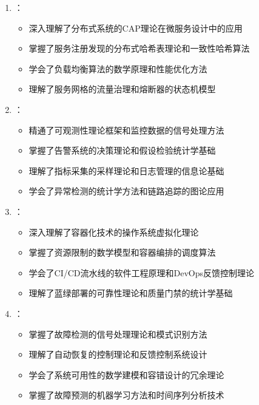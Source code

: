 \begin{enumerate}
\def\labelenumi{\arabic{enumi}.}
\tightlist
\item
  ：

  \begin{itemize}
  \tightlist
  \item
    深入理解了分布式系统的CAP理论在微服务设计中的应用
  \item
    掌握了服务注册发现的分布式哈希表理论和一致性哈希算法
  \item
    学会了负载均衡算法的数学原理和性能优化方法
  \item
    理解了服务网格的流量治理和熔断器的状态机模型
  \end{itemize}
\item
  ：

  \begin{itemize}
  \tightlist
  \item
    精通了可观测性理论框架和监控数据的信号处理方法
  \item
    掌握了告警系统的决策理论和假设检验统计学基础
  \item
    理解了指标采集的采样理论和日志管理的信息论基础
  \item
    学会了异常检测的统计学方法和链路追踪的图论应用
  \end{itemize}
\item
  ：

  \begin{itemize}
  \tightlist
  \item
    深入理解了容器化技术的操作系统虚拟化理论
  \item
    掌握了资源限制的数学模型和容器编排的调度算法
  \item
    学会了CI/CD流水线的软件工程原理和DevOps反馈控制理论
  \item
    理解了蓝绿部署的可靠性理论和质量门禁的统计学基础
  \end{itemize}
\item
  ：

  \begin{itemize}
  \tightlist
  \item
    掌握了故障检测的信号处理理论和模式识别方法
  \item
    理解了自动恢复的控制理论和反馈控制系统设计
  \item
    学会了系统可用性的数学建模和容错设计的冗余理论
  \item
    掌握了故障预测的机器学习方法和时间序列分析技术
  \end{itemize}
\end{enumerate}

